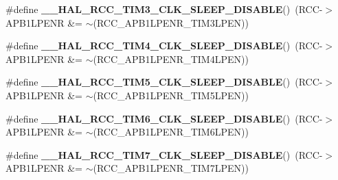 \begin{DoxyCompactItemize}
\item 
\mbox{\label{group___r_c_c_ex___peripheral___clock___sleep___enable___disable_gaf380a14a537b7a6e1c0e20fea72d65aa}} 
\#define {\bfseries \+\_\+\+\_\+\+H\+A\+L\+\_\+\+R\+C\+C\+\_\+\+T\+I\+M3\+\_\+\+C\+L\+K\+\_\+\+S\+L\+E\+E\+P\+\_\+\+D\+I\+S\+A\+B\+LE}()~(R\+CC-\/$>$A\+P\+B1\+L\+P\+E\+NR \&= $\sim$(R\+C\+C\+\_\+\+A\+P\+B1\+L\+P\+E\+N\+R\+\_\+\+T\+I\+M3\+L\+P\+EN))
\item 
\mbox{\label{group___r_c_c_ex___peripheral___clock___sleep___enable___disable_ga6d1fd6d4f7375b4abf93bd2ec4948d1d}} 
\#define {\bfseries \+\_\+\+\_\+\+H\+A\+L\+\_\+\+R\+C\+C\+\_\+\+T\+I\+M4\+\_\+\+C\+L\+K\+\_\+\+S\+L\+E\+E\+P\+\_\+\+D\+I\+S\+A\+B\+LE}()~(R\+CC-\/$>$A\+P\+B1\+L\+P\+E\+NR \&= $\sim$(R\+C\+C\+\_\+\+A\+P\+B1\+L\+P\+E\+N\+R\+\_\+\+T\+I\+M4\+L\+P\+EN))
\item 
\mbox{\label{group___r_c_c_ex___peripheral___clock___sleep___enable___disable_gaac91e3596950c8d33760debce6b0e416}} 
\#define {\bfseries \+\_\+\+\_\+\+H\+A\+L\+\_\+\+R\+C\+C\+\_\+\+T\+I\+M5\+\_\+\+C\+L\+K\+\_\+\+S\+L\+E\+E\+P\+\_\+\+D\+I\+S\+A\+B\+LE}()~(R\+CC-\/$>$A\+P\+B1\+L\+P\+E\+NR \&= $\sim$(R\+C\+C\+\_\+\+A\+P\+B1\+L\+P\+E\+N\+R\+\_\+\+T\+I\+M5\+L\+P\+EN))
\item 
\mbox{\label{group___r_c_c_ex___peripheral___clock___sleep___enable___disable_ga3dd5073cae99e103545801e21f6e25fb}} 
\#define {\bfseries \+\_\+\+\_\+\+H\+A\+L\+\_\+\+R\+C\+C\+\_\+\+T\+I\+M6\+\_\+\+C\+L\+K\+\_\+\+S\+L\+E\+E\+P\+\_\+\+D\+I\+S\+A\+B\+LE}()~(R\+CC-\/$>$A\+P\+B1\+L\+P\+E\+NR \&= $\sim$(R\+C\+C\+\_\+\+A\+P\+B1\+L\+P\+E\+N\+R\+\_\+\+T\+I\+M6\+L\+P\+EN))
\item 
\mbox{\label{group___r_c_c_ex___peripheral___clock___sleep___enable___disable_ga65016901a197f433425aca0a206b0c77}} 
\#define {\bfseries \+\_\+\+\_\+\+H\+A\+L\+\_\+\+R\+C\+C\+\_\+\+T\+I\+M7\+\_\+\+C\+L\+K\+\_\+\+S\+L\+E\+E\+P\+\_\+\+D\+I\+S\+A\+B\+LE}()~(R\+CC-\/$>$A\+P\+B1\+L\+P\+E\+NR \&= $\sim$(R\+C\+C\+\_\+\+A\+P\+B1\+L\+P\+E\+N\+R\+\_\+\+T\+I\+M7\+L\+P\+EN))

\end{DoxyCompactItemize}
